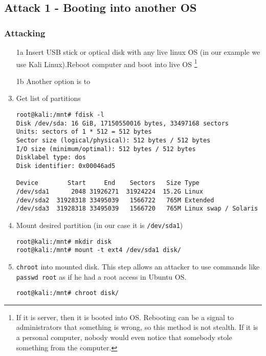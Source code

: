 \subsection{Attack 1 - Booting into another OS}\label{a1}

\subsubsection*{Attacking}
\begin{enumerate}
    \item[1a] Insert USB stick or optical disk with any live linux OS (in our example we use Kali Linux).Reboot computer and boot into live OS \footnote{If it is server, then it is booted into OS. Rebooting can be a signal to administrators that something is wrong, so this method is not stealth. If it is a personal computer, nobody would even notice that somebody stole something from the computer.}
    
    \item[1b] Another option is to     
    
    \item Get list of partitions \label{root-start}
\begin{verbatim}
root@kali:/mnt# fdisk -l
Disk /dev/sda: 16 GiB, 17150550016 bytes, 33497168 sectors
Units: sectors of 1 * 512 = 512 bytes
Sector size (logical/physical): 512 bytes / 512 bytes
I/O size (minimum/optimal): 512 bytes / 512 bytes
Disklabel type: dos
Disk identifier: 0x00046ad5

Device        Start     End    Sectors   Size Type
/dev/sda1      2048 31926271  31924224  15.2G Linux
/dev/sda2  31928318 33495039   1566722   765M Extended
/dev/sda3  31928318 33495039   1566720   765M Linux swap / Solaris
\end{verbatim}

    \item Mount desired partition (in our case it is \texttt{/dev/sda1})
    \begin{verbatim}
root@kali:/mnt# mkdir disk
root@kali:/mnt# mount -t ext4 /dev/sda1 disk/
\end{verbatim}

    \item \texttt{chroot} into mounted disk. This step allows an attacker to use commands like \texttt{passwd root} as if he had a root access in Ubuntu OS. \label{root-end}
    
\begin{verbatim}
root@kali:/mnt# chroot disk/
\end{verbatim}
\end{enumerate}

